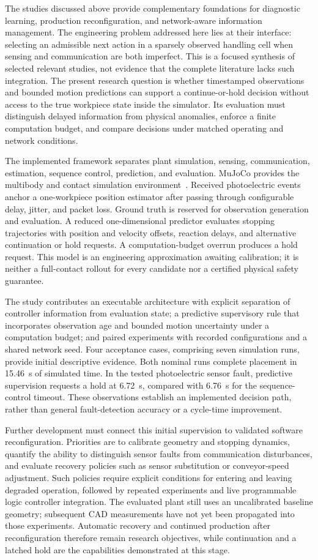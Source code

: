 The studies discussed above provide complementary foundations for diagnostic learning, production reconfiguration, and network-aware information management. The engineering problem addressed here lies at their interface: selecting an admissible next action in a sparsely observed handling cell when sensing and communication are both imperfect. This is a focused synthesis of selected relevant studies, not evidence that the complete literature lacks such integration. The present research question is whether timestamped observations and bounded motion predictions can support a continue-or-hold decision without access to the true workpiece state inside the simulator. Its evaluation must distinguish delayed information from physical anomalies, enforce a finite computation budget, and compare decisions under matched operating and network conditions.

The implemented framework separates plant simulation, sensing, communication, estimation, sequence control, prediction, and evaluation. MuJoCo provides the multibody and contact simulation environment~\cite{Todorov2012}. Received photoelectric events anchor a one-workpiece position estimator after passing through configurable delay, jitter, and packet loss. Ground truth is reserved for observation generation and evaluation. A reduced one-dimensional predictor evaluates stopping trajectories with position and velocity offsets, reaction delays, and alternative continuation or hold requests. A computation-budget overrun produces a hold request. This model is an engineering approximation awaiting calibration; it is neither a full-contact rollout for every candidate nor a certified physical safety guarantee.

The study contributes an executable architecture with explicit separation of controller information from evaluation state; a predictive supervisory rule that incorporates observation age and bounded motion uncertainty under a computation budget; and paired experiments with recorded configurations and a shared network seed. Four acceptance cases, comprising seven simulation runs, provide initial descriptive evidence. Both nominal runs complete placement in 15.46~s of simulated time. In the tested photoelectric sensor fault, predictive supervision requests a hold at 6.72~s, compared with 6.76~s for the sequence-control timeout. These observations establish an implemented decision path, rather than general fault-detection accuracy or a cycle-time improvement.

Further development must connect this initial supervision to validated software reconfiguration. Priorities are to calibrate geometry and stopping dynamics, quantify the ability to distinguish sensor faults from communication disturbances, and evaluate recovery policies such as sensor substitution or conveyor-speed adjustment. Such policies require explicit conditions for entering and leaving degraded operation, followed by repeated experiments and live programmable logic controller integration. The evaluated plant still uses an uncalibrated baseline geometry; subsequent CAD measurements have not yet been propagated into those experiments. Automatic recovery and continued production after reconfiguration therefore remain research objectives, while continuation and a latched hold are the capabilities demonstrated at this stage.
